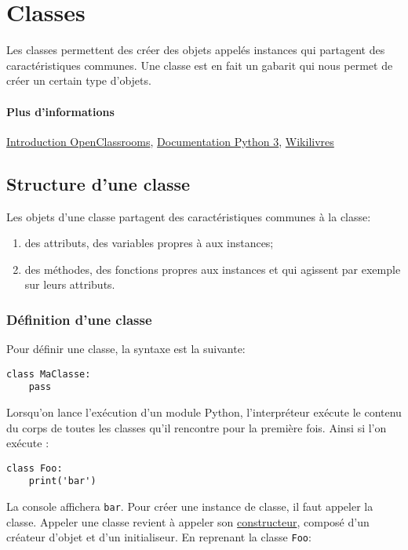 \section{Classes}

Les classes permettent des créer des objets appelés instances qui partagent des caractéristiques communes. Une classe est en fait un gabarit qui nous permet de créer un certain type d'objets.

\paragraph{Plus d'informations} \href{https://openclassrooms.com/courses/apprenez-a-programmer-en-python/premiere-approche-des-classes}{Introduction OpenClassrooms}, \href{https://docs.python.org/fr/3/tutorial/classes.html}{Documentation Python 3}, \href{https://fr.wikibooks.org/wiki/Programmation_Python/Classes#Définition_d'une_classe_élé mentaire}{Wikilivres}

\subsection{Structure d'une classe}
Les objets d'une classe partagent des caractéristiques communes à la classe:
\begin{enumerate}
	\item des attributs, des variables propres à aux instances;
	\item des méthodes, des fonctions propres aux instances et qui agissent par exemple sur leurs attributs.
\end{enumerate}


\subsubsection{Définition d'une classe}
Pour définir une classe, la syntaxe est la suivante:
\begin{verbatim}
class MaClasse:
    pass
\end{verbatim}

Lorsqu'on lance l'exécution d'un module Python, l'interpréteur exécute le contenu du corps de toutes les classes qu'il rencontre pour la première fois. Ainsi si l'on exécute :

\begin{verbatim}
class Foo:
    print('bar')
\end{verbatim}

La console affichera \texttt{bar}. Pour créer une instance de classe, il faut appeler la classe. Appeler une classe revient à appeler son \hyperref[constructeur]{constructeur}, composé d'un créateur d'objet et d'un initialiseur. En reprenant la classe \texttt{Foo}:

